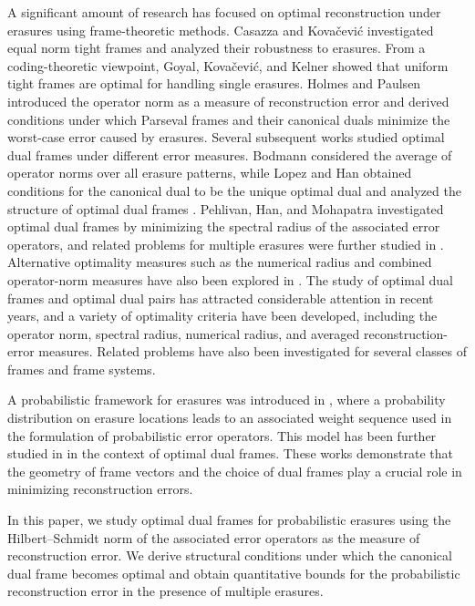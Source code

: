 \documentclass[final,1p,times]{elsarticle}
\begin{document}
A significant amount of research has focused on optimal reconstruction under erasures using frame-theoretic methods. Casazza and Kovačević \cite{casa2} investigated equal norm tight frames and analyzed their robustness to erasures. From a coding-theoretic viewpoint, Goyal, Kovačević, and Kelner \cite{goya} showed that uniform tight frames are optimal for handling single erasures. Holmes and Paulsen \cite{holm} introduced the operator norm as a measure of reconstruction error and derived conditions under which Parseval frames and their canonical duals minimize the worst-case error caused by erasures. Several subsequent works studied optimal dual frames under different error measures. Bodmann \cite{bodm1} considered the average of operator norms over all erasure patterns, while Lopez and Han \cite{jerr} obtained conditions for the canonical dual to be the unique optimal dual and analyzed the structure of optimal dual frames \cite{jins}. Pehlivan, Han, and Mohapatra \cite{sali} investigated optimal dual frames by minimizing the spectral radius of the associated error operators, and related problems for multiple erasures were further studied in \cite{peh,dev}. Alternative optimality measures such as the numerical radius and combined operator-norm measures have also been explored in \cite{ara,deep,shan1}. The study of optimal dual frames and optimal dual pairs has attracted considerable attention in recent years, and a variety of optimality criteria have been developed, including the operator norm, spectral radius, numerical radius, and averaged reconstruction-error measures. Related problems have also been investigated for several classes of frames and frame systems\cite{shan2,deep,deep1,ara,arab,arab1,arab2,shan5}.

A probabilistic framework for erasures was introduced in \cite{leng3}, where a probability distribution on erasure locations leads to an associated weight sequence used in the formulation of probabilistic error operators. This model has been further studied in \cite{leng,li2,shan,li1, shan1} in the context of optimal dual frames. These works demonstrate that the geometry of frame vectors and the choice of dual frames play a crucial role in minimizing reconstruction errors.

    
In this paper, we study optimal dual frames for probabilistic erasures using the Hilbert--Schmidt norm of the associated error operators as the measure of reconstruction error. We derive structural conditions under which the canonical dual frame becomes optimal and obtain quantitative bounds for the probabilistic reconstruction error in the presence of multiple erasures.
\end{document}
